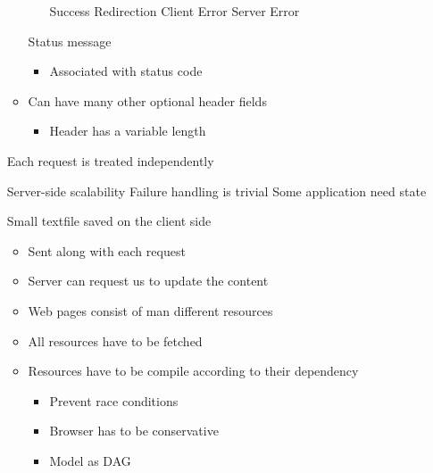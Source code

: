 \begin{itemize}
\begin{itemize}
\begin{itemize}
                     Success
                     Redirection
                     Client Error
                     Server Error
                \end{itemize}
             Status message
                \begin{itemize}
                    \item Associated with status code
                \end{itemize}
            \item Can have many other optional header fields
                \begin{itemize}
                    \item Header has a variable length
                \end{itemize}
        \end{itemize}
        \begin{itemize}
             Each request is treated independently
                \begin{itemize}
                    \ipro Server-side scalability
                    \ipro Failure handling is trivial
                    \icon Some application need state
                \end{itemize}
             Small textfile saved on the client side
                \begin{itemize}
                    \item Sent along with each request
                    \item Server can request us to update the content
                \end{itemize}
        \end{itemize}
        \begin{itemize}
            \item Web pages consist of man different resources
            \item All resources have to be fetched
            \item Resources have to be compile according to their dependency
                \begin{itemize}
                    \item Prevent race conditions
                    \item Browser has to be conservative
                    \item Model as DAG
                        \begin{itemize}

\end{itemize}
\end{itemize}
\end{itemize}
\end{itemize}
